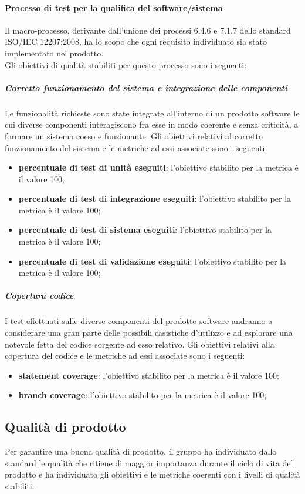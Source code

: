 			\paragraph{Processo di test per la qualifica del software/sistema}
			Il macro-processo, derivante dall'unione dei processi 6.4.6 e 7.1.7 dello standard ISO/IEC 12207:2008, ha lo scopo che ogni requisito individuato sia stato implementato nel prodotto.
			\\Gli obiettivi di qualità stabiliti per questo processo sono i seguenti:
				\subparagraph{Corretto funzionamento del sistema e integrazione delle componenti}
				Le funzionalità richieste sono state integrate all'interno di un prodotto software le cui diverse componenti interagiscono fra esse in modo coerente e senza criticità, a formare un sistema coeso e funzionante.
				Gli obiettivi relativi al corretto funzionamento del sistema e le metriche ad essi associate sono i seguenti:
		 		\begin{itemize}
					\item \textbf{percentuale di test di unità eseguiti}: l'obiettivo stabilito per la metrica è il valore 100;
					\item \textbf{percentuale di test di integrazione eseguiti}: l'obiettivo stabilito per la metrica è il valore 100;
					\item \textbf{percentuale di test di sistema eseguiti}: l'obiettivo stabilito per la metrica è il valore 100;
					\item \textbf{percentuale di test di validazione eseguiti}: l'obiettivo stabilito per la metrica è il valore 100;
				\end{itemize}
				
				\subparagraph{Copertura codice}
				I test effettuati sulle diverse componenti del prodotto software andranno a considerare una gran parte delle possibili casistiche d'utilizzo e ad esplorare una notevole fetta del codice sorgente ad esso relativo. Gli obiettivi relativi alla copertura del codice e le metriche ad essi associate sono i seguenti:
				\begin{itemize}
					\item \textbf{statement coverage}: l'obiettivo stabilito per la metrica è il valore 100;
					\item \textbf{branch coverage}: l'obiettivo stabilito per la metrica è il valore 100;
				\end{itemize}
	
	\subsection{Qualità di prodotto}
	Per garantire una buona qualità di prodotto, il gruppo \hx{} ha individuato dallo standard  le qualità che ritiene di maggior importanza durante il ciclo di vita del prodotto e ha individuato gli obiettivi e le metriche coerenti con i livelli di qualità stabiliti.
